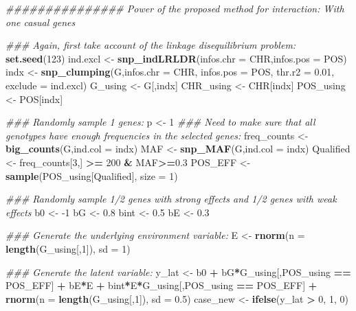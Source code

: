 \documentclass[
]{article}
\newenvironment{Shaded}{\begin{snugshade}}{\end{snugshade}}
\newcommand{\CommentTok}[1]{\textcolor[rgb]{0.56,0.35,0.01}{\textit{#1}}}
\newcommand{\DataTypeTok}[1]{\textcolor[rgb]{0.13,0.29,0.53}{#1}}
\newcommand{\DecValTok}[1]{\textcolor[rgb]{0.00,0.00,0.81}{#1}}
\newcommand{\FloatTok}[1]{\textcolor[rgb]{0.00,0.00,0.81}{#1}}
\newcommand{\KeywordTok}[1]{\textcolor[rgb]{0.13,0.29,0.53}{\textbf{#1}}}
\newcommand{\NormalTok}[1]{#1}
\newcommand{\OperatorTok}[1]{\textcolor[rgb]{0.81,0.36,0.00}{\textbf{#1}}}
\newcommand{\StringTok}[1]{\textcolor[rgb]{0.31,0.60,0.02}{#1}}
\begin{document}
\begin{Shaded}
\begin{Highlighting}[]
\CommentTok{############### Power of the proposed method for interaction: With one casual genes}

\CommentTok{### Again, first take account of the linkage disequilibrium problem:}
\KeywordTok{set.seed}\NormalTok{(}\DecValTok{123}\NormalTok{)}
\NormalTok{ind.excl <-}\StringTok{ }\KeywordTok{snp_indLRLDR}\NormalTok{(}\DataTypeTok{infos.chr =}\NormalTok{ CHR,}\DataTypeTok{infos.pos =}\NormalTok{ POS)}
\NormalTok{indx <-}\StringTok{ }\KeywordTok{snp_clumping}\NormalTok{(G,}\DataTypeTok{infos.chr =}\NormalTok{ CHR, }\DataTypeTok{infos.pos =}\NormalTok{ POS, }\DataTypeTok{thr.r2 =} \FloatTok{0.01}\NormalTok{, }\DataTypeTok{exclude =}\NormalTok{ ind.excl)}
\NormalTok{G_using <-}\StringTok{ }\NormalTok{G[,indx]}
\NormalTok{CHR_using <-}\StringTok{ }\NormalTok{CHR[indx]}
\NormalTok{POS_using <-}\StringTok{ }\NormalTok{POS[indx]}


\CommentTok{### Randomly sample 1 genes:}
\NormalTok{p <-}\StringTok{ }\DecValTok{1}
\CommentTok{### Need to make sure that all genotypes have enough frequencies in the selected genes:}
\NormalTok{freq_counts <-}\StringTok{ }\KeywordTok{big_counts}\NormalTok{(G,}\DataTypeTok{ind.col =}\NormalTok{ indx)}
\NormalTok{MAF <-}\StringTok{ }\KeywordTok{snp_MAF}\NormalTok{(G,}\DataTypeTok{ind.col =}\NormalTok{ indx)}
\NormalTok{Qualified <-}\StringTok{ }\NormalTok{freq_counts[}\DecValTok{3}\NormalTok{,] }\OperatorTok{>=}\StringTok{ }\DecValTok{200} \OperatorTok{&}\StringTok{ }\NormalTok{MAF}\OperatorTok{>=}\FloatTok{0.3}
\NormalTok{POS_EFF <-}\StringTok{ }\KeywordTok{sample}\NormalTok{(POS_using[Qualified], }\DataTypeTok{size =} \DecValTok{1}\NormalTok{)}


\CommentTok{### Randomly sample 1/2 genes with strong effects and 1/2 genes with weak effects}
\NormalTok{b0 <-}\StringTok{ }\DecValTok{-1}
\NormalTok{bG <-}\StringTok{ }\FloatTok{0.8}
\NormalTok{bint <-}\StringTok{ }\FloatTok{0.5}
\NormalTok{bE <-}\StringTok{ }\FloatTok{0.3}


\CommentTok{### Generate the underlying environment variable:}
\NormalTok{E <-}\StringTok{ }\KeywordTok{rnorm}\NormalTok{(}\DataTypeTok{n =} \KeywordTok{length}\NormalTok{(G_using[,}\DecValTok{1}\NormalTok{]), }\DataTypeTok{sd =} \DecValTok{1}\NormalTok{)}

\CommentTok{### Generate the latent variable:}
\NormalTok{y_lat <-}\StringTok{ }\NormalTok{b0 }\OperatorTok{+}\StringTok{ }\NormalTok{bG}\OperatorTok{*}\NormalTok{G_using[,POS_using }\OperatorTok{==}\StringTok{ }\NormalTok{POS_EFF] }\OperatorTok{+}\StringTok{ }\NormalTok{bE}\OperatorTok{*}\NormalTok{E }\OperatorTok{+}\StringTok{ }\NormalTok{bint}\OperatorTok{*}\NormalTok{E}\OperatorTok{*}\NormalTok{G_using[,POS_using }\OperatorTok{==}\StringTok{ }\NormalTok{POS_EFF] }\OperatorTok{+}\StringTok{ }\KeywordTok{rnorm}\NormalTok{(}\DataTypeTok{n =} \KeywordTok{length}\NormalTok{(G_using[,}\DecValTok{1}\NormalTok{]), }\DataTypeTok{sd =} \FloatTok{0.5}\NormalTok{)}
\NormalTok{case_new <-}\StringTok{ }\KeywordTok{ifelse}\NormalTok{(y_lat }\OperatorTok{>}\StringTok{ }\DecValTok{0}\NormalTok{, }\DecValTok{1}\NormalTok{, }\DecValTok{0}\NormalTok{)}


\end{Highlighting}
\end{Shaded}
\end{document}
